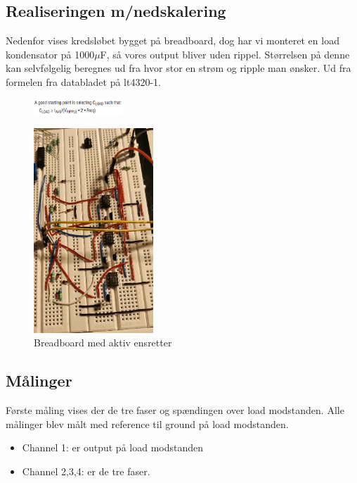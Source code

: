 \subsection{Realiseringen m/nedskalering}
\label{sec:real-mnedsk}

Nedenfor vises kredsløbet bygget på breadboard, dog har vi monteret en load kondensator på 1000$\mu$F, så vores output bliver uden rippel. Størrelsen på denne kan selvfølgelig beregnes ud fra hvor stor en strøm og ripple man ønsker. Ud fra formelen fra databladet på lt4320-1.

\begin{figure}[h]
  \centering
  \includegraphics[width=0.3\textwidth]{formel.png}
  \label{fig:formel}
\end{figure}

\begin{figure}[h]
  \centering
  \includegraphics[width=0.4\textwidth]{bread1.png}
  \caption{Breadboard med aktiv ensretter}
  \label{fig:bread1}
\end{figure}

\subsection{Målinger}
\label{sec:malinger}

Første måling vises der de tre faser og spændingen over load modstanden. Alle målinger blev målt med reference til ground på load modstanden.
\begin{itemize}
\item Channel 1: er output på load modstanden
\item Channel 2,3,4: er de tre faser.
\end{itemize}

